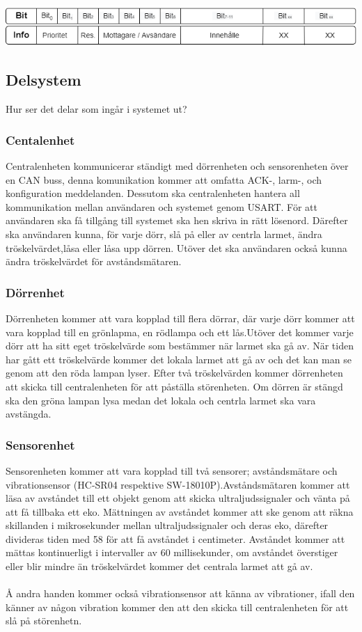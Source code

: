 \documentclass{article}
\begin{document}
\includegraphics[scale=0.5]{Projektrapport/protokoll.png}

\subsection{Delsystem}
Hur ser det delar som ingår i systemet ut?
\subsubsection{Centalenhet}
Centralenheten kommunicerar ständigt med dörrenheten och sensorenheten över en CAN buss, denna komunikation kommer att omfatta ACK-, larm-, och konfiguration meddelanden. Dessutom ska centralenheten hantera all kommunikation mellan användaren och systemet genom USART. För att användaren ska få tillgång till systemet ska hen skriva in rätt lösenord. Därefter ska användaren kunna, för varje dörr, slå på eller av centrla larmet, ändra tröskelvärdet,låsa eller låsa upp dörren. Utöver det ska användaren också kunna ändra tröskelvärdet för avståndsmätaren.



\subsubsection{Dörrenhet}

Dörrenheten kommer att vara kopplad till flera dörrar, där varje dörr kommer att vara kopplad till en grönlapma, en rödlampa och ett lås.Utöver det kommer varje dörr att ha sitt eget tröskelvärde som bestämmer när larmet ska gå av. När tiden har gått ett tröskelvärde kommer det lokala larmet att gå av och det kan man se genom att den röda lampan lyser. Efter två tröskelvärden kommer dörrenheten att skicka till centralenheten för att påställa störenheten. Om dörren är stängd ska den gröna lampan lysa medan det lokala och centrla larmet ska vara avstängda. 

\subsubsection{Sensorenhet}

Sensorenheten kommer att vara kopplad till två sensorer; avståndsmätare och vibrationsensor (HC-SR04 respektive SW-18010P).Avståndsmätaren kommer att läsa av avståndet till ett objekt genom att skicka ultraljudssignaler och vänta på att få tillbaka ett eko. Mättningen av avståndet kommer att ske genom att räkna skillanden i mikrosekunder mellan ultraljudssignaler och deras eko, därefter divideras tiden med 58 för att få avståndet i centimeter. Avståndet kommer att mättas kontinuerligt i intervaller av 60 millisekunder, om avståndet överstiger eller blir mindre än tröskelvärdet kommer det centrala larmet att gå av.\\
\\
Å andra handen kommer också vibrationsensor att känna av vibrationer, ifall den känner av någon vibration kommer den att den skicka till centralenheten för att slå på störenhetn.
\end{document}
